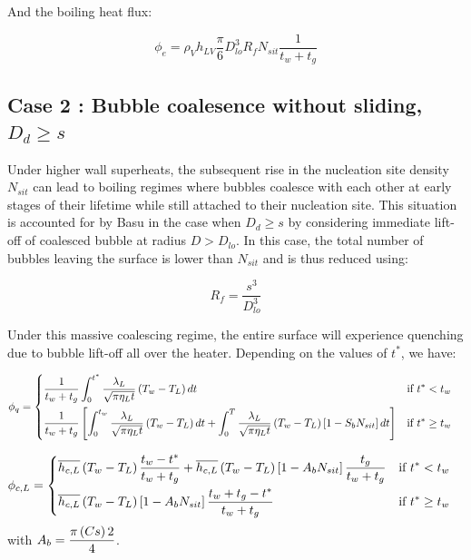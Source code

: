 And the boiling heat flux:

\begin{equation}
\phi_{e} = \rho_{V}h_{LV}\frac{\pi}{6}D_{lo}^{3}R_{f}N_{sit}\frac{1}{t_{w}+t_{g}}
\label{eq:HFP_B_phiE}
\end{equation}


\subsection{Case 2 : Bubble coalesence without sliding, $D_{d}\geq s$}

Under higher wall superheats, the subsequent rise in the nucleation site density $N_{sit}$ can lead to boiling regimes where bubbles coalesce with each other at early stages of their lifetime \ie while still attached to their nucleation site. This situation is accounted for by Basu \etal in the case when $D_{d} \geq s$ by considering immediate lift-off of coalesced bubble at radius $D > D_{lo}$. In this case, the total number of bubbles leaving the surface is lower than $N_{sit}$ and is thus reduced using:

\begin{equation}
R_{f} = \frac{s^{3}}{D_{lo}^{3}}
\end{equation}

Under this massive coalescing regime, the entire surface will experience quenching due to bubble lift-off all over the heater. Depending on the values of $t^{*}$, we have:

\begin{align}
\phi_{q} &= 
\begin{dcases} \dfrac{1}{t_{w}+t_{g}} \int_{0}^{t^{*}}\dfrac{\lambda_{L}}{\sqrt{\pi \eta_{L}t}}\parth{T_{w}-T_{L}}dt & \text{if } t^{*}<t_{w} \\
%
\dfrac{1}{t_{w}+t_{g}} \crocht{ \int_{0}^{t_{w}}\dfrac{\lambda_{L}}{\sqrt{\pi \eta_{L}t}}\parth{T_{w}-T_{L}}dt + \int_{0}^{T}\dfrac{\lambda_{L}}{\sqrt{\pi \eta_{L}t}}\parth{T_{w}-T_{L}}\crocht{1-S_{b}N_{sit}}dt} & \text{if } t^{*}\geq t_{w} 
\end{dcases}
\end{align}

\begin{align}
\phi_{c,L} &= 
\begin{dcases} \overline{h_{c,L}}\parth{T_{w}-T_{L}}\frac{t_{w}-t^{*}}{t_{w}+t_{g}} + \overline{h_{c,L}}\parth{T_{w}-T_{L}}\crocht{1-A_{b}N_{sit}}\frac{t_{g}}{t_{w}+t_{g}} & \text{if } t^{*}<t_{w} \\
%
\overline{h_{c,L}}\parth{T_{w}-T_{L}}\crocht{1-A_{b}N_{sit}}\frac{t_{w}+t_{g}-t^{*}}{t_{w}+t_{g}} & \text{if } t^{*}\geq t_{w} 
\end{dcases}
\end{align}
with $A_{b} = \dfrac{\pi \left( Cs \right)2}{4}$.

